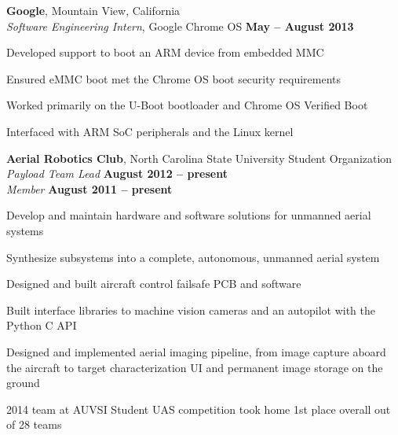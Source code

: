 \documentclass[margin,line,letterpaper]{resume}
\begin{document}
\begin{resume}
    \textbf{Google}, Mountain View, California \vspace{1mm}\\\vspace{1mm}%
    \textsl{Software Engineering Intern}, Google Chrome OS \hfill \textbf{May -- August 2013}\vspace{-3mm}\\\vspace{-1mm}%
    \begin{list2}
    \item Developed support to boot an ARM device from embedded MMC
    \item Ensured eMMC boot met the Chrome OS boot security requirements
    \item Worked primarily on the U-Boot bootloader and Chrome OS Verified Boot
    \item Interfaced with ARM SoC peripherals and the Linux kernel
    \end{list2}

    \textbf{Aerial Robotics Club}, North Carolina State University Student Organization \vspace{1mm}\\\vspace{1mm}%
    \textsl{Payload Team Lead} \hfill \textbf{August 2012 -- present}\\
    \textsl{Member} \hfill \textbf{August 2011 -- present}\vspace{-3mm}\\
    \begin{list2}
    \item Develop and maintain hardware and software solutions for unmanned aerial systems
    \item Synthesize subsystems into a complete, autonomous, unmanned aerial system
    \item Designed and built aircraft control failsafe PCB and software
    \item Built interface libraries to machine vision cameras and an autopilot with the Python C API
    \item Designed and implemented aerial imaging pipeline, from image capture aboard the aircraft
        to target characterization UI and permanent image storage on the ground
    \item 2014 team at AUVSI Student UAS competition took home 1st place overall out of 28 teams
    \end{list2}


\end{resume}
\end{document}
